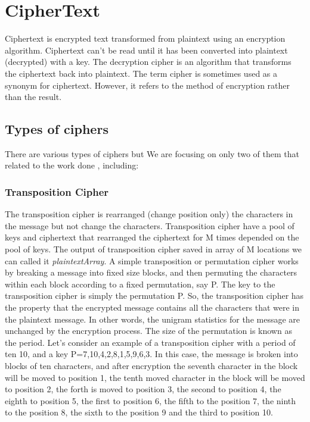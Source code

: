 \section{CipherText}
Ciphertext is encrypted text transformed from plaintext using an encryption algorithm. Ciphertext can't be read until it has been converted into  plaintext (decrypted) with a key. The decryption cipher is an algorithm that transforms the ciphertext back into plaintext.
The term cipher is sometimes used as a synonym for ciphertext. However, it refers to the method of encryption rather than the result.

\subsection{Types of ciphers}
There are various types of ciphers but We are focusing on only two of them that related to the work done , including:

\subsubsection{Transposition Cipher}
The transposition cipher is rearranged (change position only) the characters in the message but not change the characters. Transposition cipher have a pool of keys and ciphertext that rearranged the ciphertext for M times depended on the pool of keys. The output of transposition cipher saved in array of M locations we can called it \textit{plaintextArray}.
A simple transposition or permutation cipher works by breaking a message into fixed size blocks, and then permuting the characters within each block according to a fixed permutation, say P. The key to the transposition cipher is simply the permutation P. So, the transposition cipher has the property that the encrypted message contains all the characters that were in the plaintext message. In other words, the unigram statistics for the message are unchanged by the encryption process. The size of the permutation is known as the period. Let's consider an example of a transposition cipher with a period of ten 10, and a key P={7,10,4,2,8,1,5,9,6,3}. In this case, the message is broken into blocks of ten characters, and after encryption the seventh character in the block will be moved to position 1, the tenth moved character in the block will be moved to position 2, the forth is moved to position 3, the second to position 4, the eighth to position 5, the first to position 6, the fifth to the position 7, the ninth to the position 8, the sixth to the position 9 and the third to position 10.

